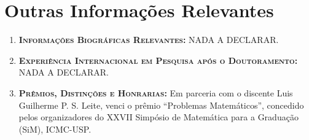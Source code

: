 \section{Outras Informações Relevantes}
\begin{enumerate}[label=\arabic{section}.\alph*), format=\bfseries, itemsep=0.5\baselineskip, topsep=0.5\baselineskip]
	\item \textsc{\bfseries Informações Biográficas Relevantes:}
	NADA A DECLARAR.

	\item \textsc{\bfseries Experiência Internacional em Pesquisa após o Doutoramento:}
	NADA A DECLARAR.

	\item \textsc{\bfseries Prêmios, Distinções e Honrarias:}
	Em parceria com o discente Luis Guilherme P. S. Leite, venci o prêmio ``Problemas Matemáticos'', concedido pelos organizadores do XXVII Simpósio de Matemática para a Graduação (SiM), ICMC-USP.
\end{enumerate}
